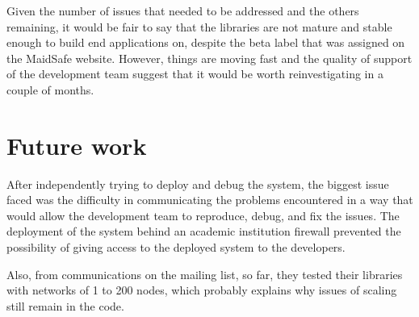 Given the number of issues that needed to be addressed and the others remaining, it would be fair to say that the libraries are not mature and stable enough to build end applications on, despite the beta label that was assigned on the MaidSafe website. However, things are moving fast and the quality of support of the development team suggest that it would be worth reinvestigating in a couple of months.  

\section{Future work}

After independently trying to deploy and debug the system, the biggest issue faced was the difficulty in communicating the problems encountered in a way that would allow the development team to reproduce, debug, and fix the issues. The deployment of the system behind an academic institution firewall prevented the possibility of giving access to the deployed system to the developers. 

Also, from communications on the mailing list, so far, they tested their libraries with networks of 1 to 200 nodes, which probably explains why issues of scaling still remain in the code.

